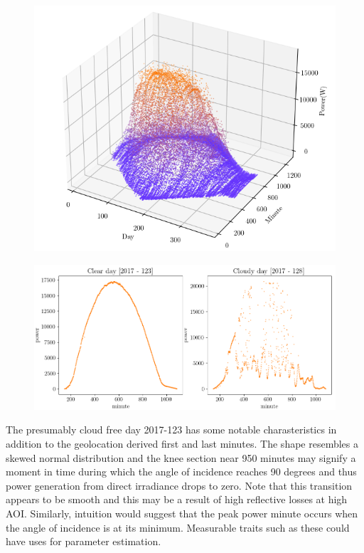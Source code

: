 
\begin{figure}[h]
\centering
\includegraphics[width=0.8\linewidth]{pics/oneyear2}
\label{fig_oneyear_pointcloud}
\end{figure}

\newpage
\begin{figure}[h!]
\centering
\includegraphics[width=1\linewidth]{pics/cloudfree_vs_cloudy}
\label{fig_cloudfree_vs_cloudy}
\end{figure}

The presumably cloud free day 2017-123 has some notable charasteristics in addition to the geolocation derived first and last minutes. The shape resembles a skewed normal distribution and the knee section near 950 minutes may signify a moment in time during which the angle of incidence reaches 90 degrees and thus power generation from direct irradiance drops to zero. Note that this transition appears to be smooth and this may be a result of high reflective losses at high AOI. Similarly, intuition would suggest that the peak power minute occurs when the angle of incidence is at its minimum. Measurable traits such as these could have uses for parameter estimation.


